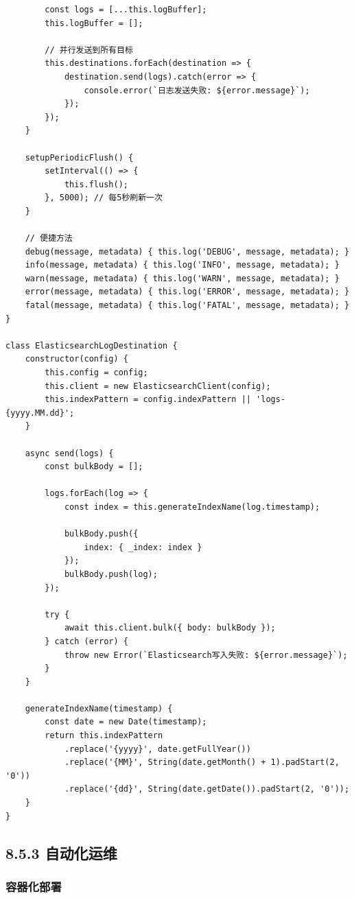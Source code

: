 \begin{lstlisting}
        const logs = [...this.logBuffer];
        this.logBuffer = [];
        
        // 并行发送到所有目标
        this.destinations.forEach(destination => {
            destination.send(logs).catch(error => {
                console.error(`日志发送失败: ${error.message}`);
            });
        });
    }
    
    setupPeriodicFlush() {
        setInterval(() => {
            this.flush();
        }, 5000); // 每5秒刷新一次
    }
    
    // 便捷方法
    debug(message, metadata) { this.log('DEBUG', message, metadata); }
    info(message, metadata) { this.log('INFO', message, metadata); }
    warn(message, metadata) { this.log('WARN', message, metadata); }
    error(message, metadata) { this.log('ERROR', message, metadata); }
    fatal(message, metadata) { this.log('FATAL', message, metadata); }
}

class ElasticsearchLogDestination {
    constructor(config) {
        this.config = config;
        this.client = new ElasticsearchClient(config);
        this.indexPattern = config.indexPattern || 'logs-{yyyy.MM.dd}';
    }
    
    async send(logs) {
        const bulkBody = [];
        
        logs.forEach(log => {
            const index = this.generateIndexName(log.timestamp);
            
            bulkBody.push({
                index: { _index: index }
            });
            bulkBody.push(log);
        });
        
        try {
            await this.client.bulk({ body: bulkBody });
        } catch (error) {
            throw new Error(`Elasticsearch写入失败: ${error.message}`);
        }
    }
    
    generateIndexName(timestamp) {
        const date = new Date(timestamp);
        return this.indexPattern
            .replace('{yyyy}', date.getFullYear())
            .replace('{MM}', String(date.getMonth() + 1).padStart(2, '0'))
            .replace('{dd}', String(date.getDate()).padStart(2, '0'));
    }
}
\end{lstlisting}

\subsection{8.5.3 自动化运维}\label{ux81eaux52a8ux5316ux8fd0ux7ef4}

\subsubsection{容器化部署}\label{ux5bb9ux5668ux5316ux90e8ux7f72}

